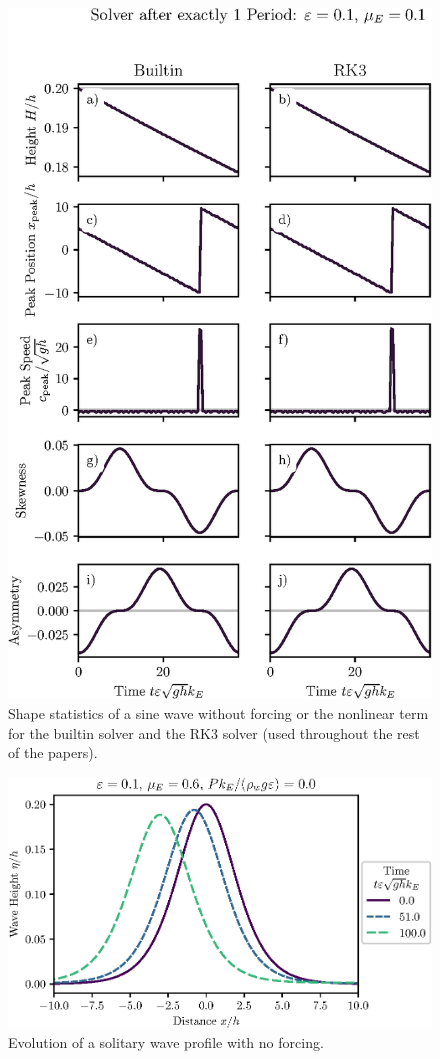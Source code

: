 \documentclass{jfm}
\begin{document}
\begin{figure}
  \centering
  \includegraphics{TrigStatistics.eps}
  \caption{
    Shape statistics of a sine wave without forcing or the nonlinear
    term for the builtin solver and the RK3 solver (used throughout the
    rest of the papers).
  }
\end{figure}

\begin{figure}
  \centering
  \includegraphics{Long-Run.eps}
  \caption{
    Evolution of a solitary wave profile with no forcing.
  }
\end{figure}
\end{document}
